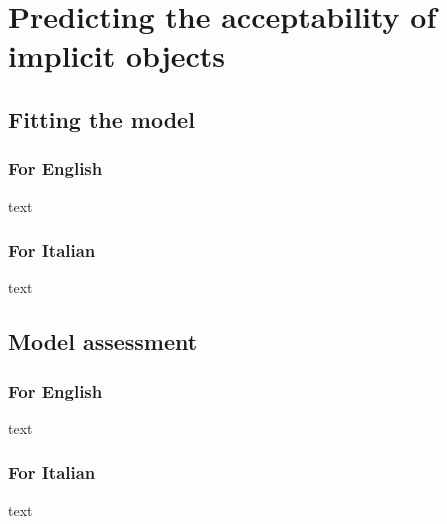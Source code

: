 \setchapterpreamble[u]{\margintoc}
\chapter{Predicting the acceptability of implicit objects}

\section{Fitting the model} 

\subsection{For English} 

text

\subsection{For Italian} 

text


\section{Model assessment} 

\subsection{For English} 

text

\subsection{For Italian} 

text
